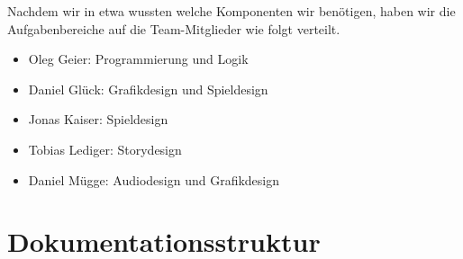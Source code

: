 Nachdem wir in etwa wussten welche Komponenten wir benötigen, haben wir die Aufgabenbereiche auf die Team-Mitglieder wie folgt verteilt.

\begin{itemize}

\item Oleg Geier: Programmierung und Logik

\item Daniel Glück: Grafikdesign und Spieldesign

\item Jonas Kaiser: Spieldesign

\item Tobias Lediger: Storydesign

\item Daniel Mügge: Audiodesign und Grafikdesign

\end{itemize}




\section{Dokumentationsstruktur}



